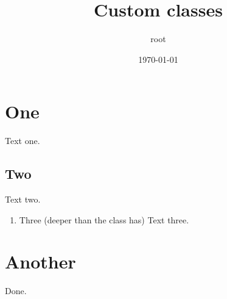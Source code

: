 \documentclass[12pt]{article}
\author{root}
\date{\today}
\title{Custom classes}
\begin{document}
\maketitle
\tableofcontents


\section{One}
\label{sec:org2dc7787}
Text one.
\subsection{Two}
\label{sec:org138ca30}
Text two.
\begin{enumerate}
\item Three (deeper than the class has)
\label{sec:org09b8944}
Text three.
\end{enumerate}
\section{Another}
\label{sec:org0db8dbb}
Done.
\end{document}
